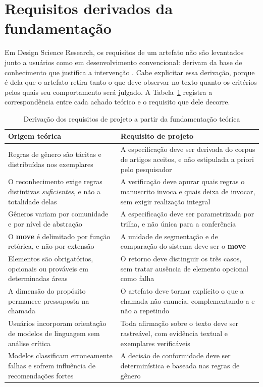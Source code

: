 

\section{Requisitos derivados da fundamentação}
\label{sec:requisitos}

Em Design Science Research, os requisitos de um artefato não são levantados junto a usuários como em desenvolvimento convencional: derivam da base de conhecimento que justifica a intervenção \cite{Hevner2004}. Cabe explicitar essa derivação, porque é dela que o artefato retira tanto o que deve observar no texto quanto os critérios pelos quais seu comportamento será julgado. A Tabela~\ref{tab:requisitos} registra a correspondência entre cada achado teórico e o requisito que dele decorre.

\begin{table}[H]
\centering
\caption{Derivação dos requisitos de projeto a partir da fundamentação teórica}
\label{tab:requisitos}
\small
\begin{tabular}{|p{6.4cm}|p{7.4cm}|}
\hline
\textbf{Origem teórica} & \textbf{Requisito de projeto} \\
\hline
Regras de gênero são tácitas e distribuídas nos exemplares \cite{GenresOrgComm} & A especificação deve ser derivada do corpus de artigos aceitos, e não estipulada a priori pelo pesquisador \\
\hline
O reconhecimento exige regras distintivas \textit{suficientes}, e não a totalidade delas \cite{GenresOrgComm} & A verificação deve apurar quais regras o manuscrito invoca e quais deixa de invocar, sem exigir realização integral \\
\hline
Gêneros variam por comunidade e por nível de abstração \cite{GenreRepertoire} & A especificação deve ser parametrizada por trilha, e não única para a conferência \\
\hline
O \textbf{move} é delimitado por função retórica, e não por extensão \cite{GenreAnalysis} & A unidade de segmentação e de comparação do sistema deve ser o \textbf{move} \\
\hline
Elementos são obrigatórios, opcionais ou prováveis em determinadas áreas \cite{ResearchGenres} & O retorno deve distinguir os três casos, sem tratar ausência de elemento opcional como falha \\
\hline
A dimensão do propósito permanece pressuposta na chamada \cite{GenreSystems} & O artefato deve tornar explícito o que a chamada não enuncia, complementando-a e não a repetindo \\
\hline
Usuários incorporam orientação de modelos de linguagem sem análise crítica \cite{WhyandWhen} & Toda afirmação sobre o texto deve ser rastreável, com evidência textual e exemplares verificáveis \\
\hline
Modelos classificam erroneamente falhas e sofrem influência de recomendações fortes \cite{WhereLLMWrong} & A decisão de conformidade deve ser determinística e baseada nas regras de gênero \\
\hline
\end{tabular}
\end{table}

